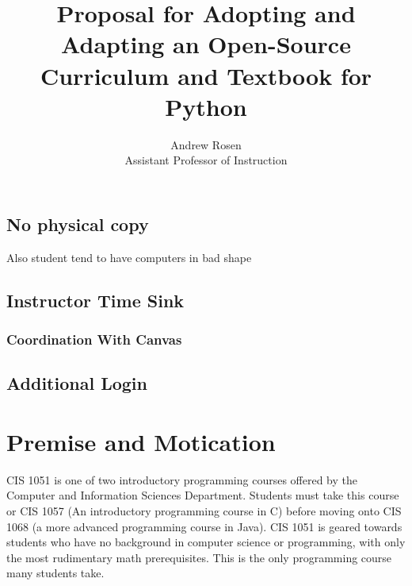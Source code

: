 \documentclass[]{article}
\title{Proposal for Adopting and Adapting an Open-Source Curriculum and Textbook for Python }
\author{Andrew Rosen\\ Assistant Professor of Instruction}
\begin{document}
%
%
%
%
%
%
%
%


\subsection{No physical copy}
Also student tend to have computers in bad shape
\subsection{Instructor Time Sink}
\subsubsection{Coordination With Canvas}
\subsection{Additional Login}



\maketitle

\section{Premise and Motication}
CIS 1051 is one of two introductory programming courses offered by the Computer and Information Sciences Department.  
Students must take this course or CIS 1057 (An introductory programming course in C) before moving onto CIS 1068 (a more advanced programming course in Java). CIS 1051 is geared towards students who have no background in computer science or programming, with only the most rudimentary math prerequisites.  This is the only programming course many students take.
\end{document}
